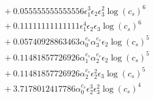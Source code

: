 \documentclass[10pt]{article}
\begin{document}
\begin{align*}
&{}  + 0.055555555555556 \epsilon_{1}^{3} \epsilon_{2} \epsilon_{3}^{2} \log{\left(c_{s} \right)}^{6} \\
&{}  + 0.11111111111111 \epsilon_{1}^{4} \epsilon_{2} \epsilon_{3} \log{\left(c_{s} \right)}^{6} \\
&{}  + 0.05740928863463 \alpha_{0}^{c_s} \alpha_{3}^{c_s} \epsilon_{2} \log{\left(c_{s} \right)}^{5} \\
&{}  + 0.11481857726926 \alpha_{1}^{c_s} \alpha_{2}^{c_s} \epsilon_{2} \log{\left(c_{s} \right)}^{5} \\
&{}  + 0.11481857726926 \alpha_{2}^{c_s} \epsilon_{2}^{2} \epsilon_{3} \log{\left(c_{s} \right)}^{5} \\
&{}  + 3.7178012417786 \alpha_{0}^{c_s} \epsilon_{2}^{3} \epsilon_{3}^{2} \log{\left(c_{s} \right)}^{4}
\end{align*}
\end{document}
